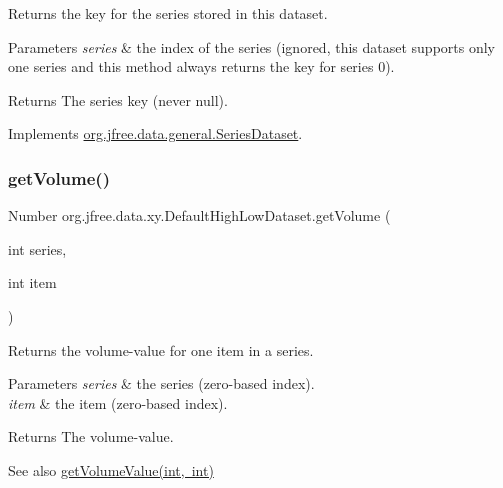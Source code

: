 Returns the key for the series stored in this dataset.


\begin{DoxyParams}{Parameters}
{\em series} & the index of the series (ignored, this dataset supports only one series and this method always returns the key for series 0).\\
\hline
\end{DoxyParams}
\begin{DoxyReturn}{Returns}
The series key (never {\ttfamily null}). 
\end{DoxyReturn}


Implements \mbox{\hyperlink{interfaceorg_1_1jfree_1_1data_1_1general_1_1_series_dataset_a60488892b2314a05a012999e26a74178}{org.\+jfree.\+data.\+general.\+Series\+Dataset}}.

\mbox{\label{classorg_1_1jfree_1_1data_1_1xy_1_1_default_high_low_dataset_a36d4aedaf6e8a20597f5127434bc0562}} 
\subsubsection{\texorpdfstring{get\+Volume()}{getVolume()}}
{\footnotesize\ttfamily Number org.\+jfree.\+data.\+xy.\+Default\+High\+Low\+Dataset.\+get\+Volume (\begin{DoxyParamCaption}\item[{int}]{series,  }\item[{int}]{item }\end{DoxyParamCaption})}

Returns the volume-\/value for one item in a series.


\begin{DoxyParams}{Parameters}
{\em series} & the series (zero-\/based index). \\
\hline
{\em item} & the item (zero-\/based index).\\
\hline
\end{DoxyParams}
\begin{DoxyReturn}{Returns}
The volume-\/value.
\end{DoxyReturn}
\begin{DoxySeeAlso}{See also}
\mbox{\hyperlink{classorg_1_1jfree_1_1data_1_1xy_1_1_default_high_low_dataset_af97ca5089ee14cddbd768a78af00a501}{get\+Volume\+Value(int, int)}} 
\end{DoxySeeAlso}


